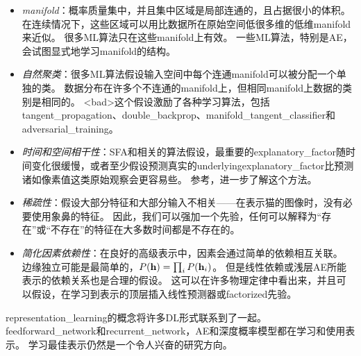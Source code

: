 \begin{itemize}
	\item \emph{\gls{manifold}}：概率质量集中，并且集中区域是局部连通的，且占据很小的体积。
	在连续情况下，这些区域可以用比数据所在原始空间低很多维的低维\gls{manifold}来近似。
	很多\gls{ML}算法只在这些\gls{manifold}上有效\citep{Goodfellow-2015-adversarial}。
	一些\gls{ML}算法，特别是\gls{AE}，会试图显式地学习\gls{manifold}的结构。


	\item \emph{自然聚类}：很多\gls{ML}算法假设输入空间中每个连通\gls{manifold}可以被分配一个单独的类。
	数据分布在许多个不连通的\gls{manifold}上，但相同\gls{manifold}上数据的类别是相同的。
	<bad>这个假设激励了各种学习算法，包括\gls{tangent_propagation}、\gls{double_backprop}、\gls{manifold_tangent_classifier}和\gls{adversarial_training}。


	\item \emph{时间和空间相干性}：\gls{SFA}和相关的算法假设，最重要的\gls{explanatory_factor}随时间变化很缓慢，或者至少假设预测真实的\gls{underlying}\gls{explanatory_factor}比预测诸如像素值这类原始观察会更容易些。
	参考，进一步了解这个方法。


	\item \emph{稀疏性}：假设大部分特征和大部分输入不相关——在表示猫的图像时，没有必要使用象鼻的特征。
	因此，我们可以强加一个先验，任何可以解释为``存在''或``不存在''的特征在大多数时间都是不存在的。


	\item \emph{简化因素依赖性}：在良好的高级表示中，因素会通过简单的依赖相互关联。
	边缘独立可能是最简单的，$P(\mathbf{h}) = \prod_i P(\mathbf{h}_i)$。
	但是线性依赖或浅层\gls{AE}所能表示的依赖关系也是合理的假设。
	这可以在许多物理定律中看出来，并且可以假设，在学习到表示的顶层插入线性预测器或\gls{factorized}先验。
\end{itemize}


\gls{representation_learning}的概念将许多\gls{DL}形式联系到了一起。
\gls{feedforward_network}和\gls{recurrent_network}，\gls{AE}和深度概率模型都在学习和使用表示。
学习最佳表示仍然是一个令人兴奋的研究方向。

